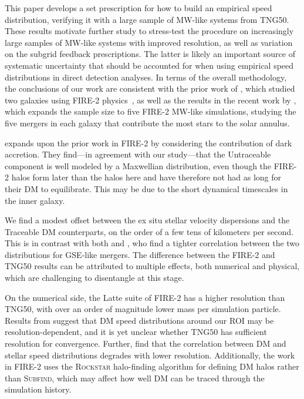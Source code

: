 \documentclass[twocolumn,tighten,twocolappendix]{aastex701}
\newcommand{\subfind}{\textsc{Subfind}}
\begin{document}
This paper develops a set prescription for how to build an empirical speed distribution, verifying it with a large sample of MW-like systems from TNG50.  These results motivate further study to stress-test the procedure on increasingly large samples of MW-like systems with improved resolution, as well as variation on the subgrid feedback prescriptions.  The latter is likely an important source of systematic uncertainty that should be accounted for when using empirical speed distributions in direct detection analyses.  In terms of the overall methodology, the conclusions of our work are consistent with the prior work of \cite{2019ApJ...883...27N}, which studied two galaxies using FIRE-2 physics~\citep{2016ApJ...827L..23W}, as well as the results in the recent work by \cite{2026arXiv260325783Z}, which expands the sample size to five FIRE-2 MW-like simulations, studying the five mergers in each galaxy that contribute the most stars to the solar annulus. 

\citet{2026arXiv260325783Z} expands upon the prior work in FIRE-2 by considering 
the contribution of dark accretion.  They find---in agreement with our study---that the Untraceable component is well modeled by a Maxwellian distribution, even though the FIRE-2 halos form later than the halos here and have therefore not had as long for their DM to equilibrate. This may be due to the short dynamical timescales in the inner galaxy. 

We find a modest offset between the ex situ stellar velocity dispersions and the Traceable DM counterparts, on the order of a few tens of kilometers per second. This is in contrast with both \cite{2019ApJ...883...27N} and \cite{2026arXiv260325783Z}, who find a tighter correlation between the two distributions for GSE-like mergers. The difference between the FIRE-2 and TNG50 results can be attributed to multiple effects, both numerical and physical, which are challenging to disentangle at this stage.  

On the numerical side, the Latte suite of FIRE-2 has a higher resolution than TNG50, with over an order of magnitude lower mass per simulation particle. Results from \citet{2025arXiv251204157L} suggest that DM speed distributions around our ROI may be resolution-dependent, and it is yet unclear whether TNG50 has sufficient resolution for convergence. Further, \cite{2026arXiv260325783Z} find that the correlation between DM and stellar speed distributions degrades with lower resolution. Additionally, the work in FIRE-2 uses the \textsc{Rockstar} halo-finding algorithm for defining DM halos rather than \subfind{}, which may affect how well DM can be traced through the simulation history. 
\end{document}
